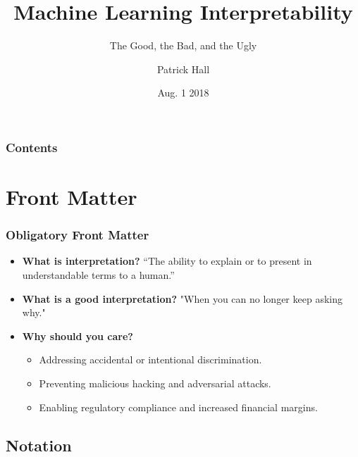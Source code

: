 \documentclass[11pt, 
               aspectratio=169]{beamer}
\author{Patrick Hall}
\title{Machine Learning Interpretability}
\subtitle{The Good, the Bad, and the Ugly}
\institute{H\textsubscript{2}O.ai}
\date{Aug. 1 2018}
\begin{document}
	
	\maketitle
	
	\begin{frame}
		\frametitle{Contents}
		\tableofcontents{}
	\end{frame}

	\section{Front Matter}
	
	\begin{frame}
	
		\frametitle{Obligatory Front Matter}
		
			\begin{itemize}
				
				\item \textbf{What is interpretation?} “The	ability	to explain or to present in understandable terms to	a human.” \cite{been_kim1}
				
				\item \textbf{What is a good interpretation?} "When you can no longer keep asking why." \cite{gilpin2018explaining}
				
				\item \textbf{Why should you care?}
				\begin{itemize}
					\item Addressing accidental or intentional discrimination.
					\item Preventing malicious hacking and adversarial attacks.
					\item Enabling regulatory compliance and increased financial margins.
				\end{itemize}
				
			\end{itemize}
		
		
	\end{frame}


	\subsection{Notation}
	
\end{document}
